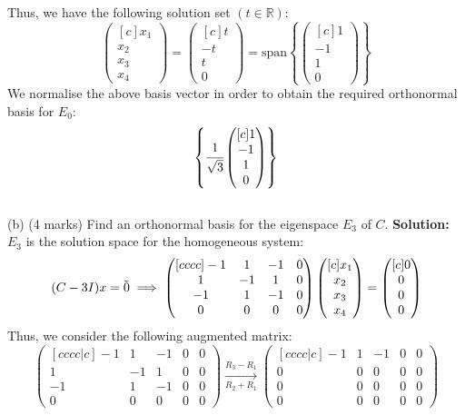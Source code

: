 \documentclass{article}
\begin{document}
Thus, we have the following solution set $(t \in \mathbb{R})$:
$$\begin{pmatrix}[c] x_1 \\ x_2 \\ x_3 \\ x_4 \end{pmatrix} = \begin{pmatrix}[c] t \\ -t \\ t \\ 0 \end{pmatrix} = \text{span} \left\{\begin{pmatrix}[c] 1 \\ -1 \\ 1 \\ 0 \end{pmatrix}\right\}$$
We normalise the above basis vector in order to obtain the required orthonormal basis for $E_0$:
$$\left\{ \cfrac{1}{\sqrt{3}}\begin{pmatrix}[c] 1 \\ -1 \\ 1 \\ 0 \end{pmatrix}\right\}$$
\newline
\\ (b) (4 marks)  Find an orthonormal basis for the eigenspace $E_3$ of $C$.
\newline
\textbf{Solution:}
$E_3$ is the solution space for the homogeneous system:
$$(C - 3I)x = \Tilde{0} \implies \begin{pmatrix}[cccc]
    -1 & 1 & -1 & 0 \\
    1 & -1 & 1 & 0\\
    -1 & 1 & -1 & 0 \\
    0 & 0 & 0 & 0
    \end{pmatrix} 
    \begin{pmatrix}[c] x_1 \\ x_2 \\ x_3 \\ x_4 \end{pmatrix} = 
     \begin{pmatrix}[c] 0 \\ 0 \\ 0 \\ 0 \end{pmatrix}$$
Thus, we consider the following augmented matrix:
$$
\begin{pmatrix}[cccc|c]
    -1 & 1 & -1 & 0 & 0 \\
    1 & -1 & 1 & 0 & 0 \\
    -1 & 1 & -1 & 0 & 0 \\
    0 & 0 & 0 & 0 & 0
\end{pmatrix}
\xrightarrow[R_2 + R_1]{R_3 - R_1}
\begin{pmatrix}[cccc|c]
    -1 & 1 & -1 & 0 & 0 \\
    0 & 0 & 0 & 0 & 0 \\
    0 & 0 & 0 & 0 & 0 \\
    0 & 0 & 0 & 0 & 0
\end{pmatrix}
$$
\end{document}
